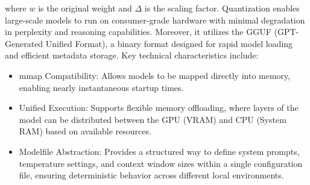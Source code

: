 where $w$ is the original weight and $\Delta$ is the scaling factor. Quantization enables large-scale models to run on consumer-grade hardware with minimal degradation in perplexity and reasoning capabilities.
Moreover, it utilizes the {GGUF (GPT-Generated Unified Format)}, a binary format designed for rapid model loading and efficient metadata storage. Key technical characteristics include:
\begin{itemize}
    \item {mmap Compatibility:} Allows models to be mapped directly into memory, enabling nearly instantaneous startup times.
    \item {Unified Execution:} Supports flexible memory offloading, where layers of the model can be distributed between the GPU (VRAM) and CPU (System RAM) based on available resources.
    \item {Modelfile Abstraction:} Provides a structured way to define system prompts, temperature settings, and context window sizes within a single configuration file, ensuring deterministic behavior across different local environments.
\end{itemize}

